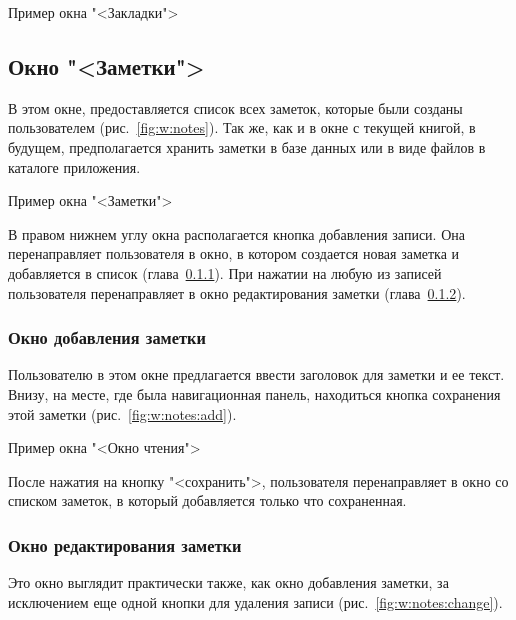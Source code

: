 \begin{image}
	\caption{Пример окна "<Закладки">}
	\label{fig:w:book:bookmark}
\end{image}

\subsection{Окно "<Заметки">}
В этом окне, предоставляется список всех заметок, которые были
созданы пользователем (рис.~\ref{fig:w:notes}).
Так же, как и в окне с текущей книгой, в будущем, предполагается
хранить заметки в базе данных или в виде файлов в каталоге приложения.

\begin{image}
	\caption{Пример окна "<Заметки">}
	\label{fig:w:notes}
\end{image}

В правом нижнем углу окна располагается кнопка добавления записи.
Она перенаправляет пользователя в окно, в котором создается новая заметка
и добавляется в список (глава~\ref{sct:note:add}).
При нажатии на любую из записей пользователя
перенаправляет в окно редактирования заметки (глава~\ref{sct:note:change}).

\subsubsection{Окно добавления заметки}\label{sct:note:add}
Пользователю в этом окне предлагается ввести заголовок для заметки и
ее текст. Внизу, на месте, где была навигационная панель, находиться
кнопка сохранения этой заметки (рис.~\ref{fig:w:notes:add}).\par

\begin{image}
	\caption{Пример окна "<Окно чтения">}
	\label{fig:w:notes:add}
\end{image}

После нажатия на кнопку "<сохранить">, пользователя перенаправляет в
окно со списком заметок, в который добавляется только что сохраненная.

\subsubsection{Окно редактирования заметки}\label{sct:note:change}
Это окно выглядит практически также, как окно добавления заметки, за
исключением еще одной кнопки для удаления записи
(рис.~\ref{fig:w:notes:change}).\par

